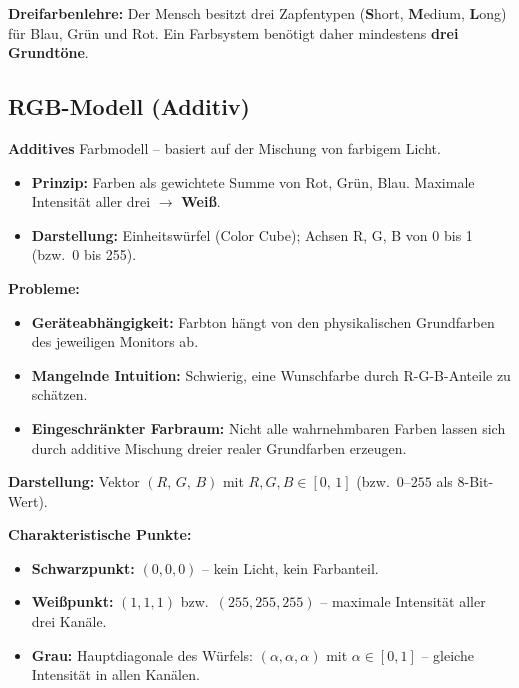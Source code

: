 \documentclass[12pt, a4paper]{article}
\begin{document}
\begin{notebox}
  \textbf{Dreifarbenlehre:} Der Mensch besitzt drei Zapfentypen
  (\textbf{S}hort, \textbf{M}edium, \textbf{L}ong) für Blau, Grün und Rot.
  Ein Farbsystem benötigt daher mindestens \textbf{drei Grundtöne}.
\end{notebox}

\subsection{RGB-Modell (Additiv)}

\textbf{Additives} Farbmodell -- basiert auf der Mischung von farbigem Licht.

\begin{itemize}
  \item \textbf{Prinzip:} Farben als gewichtete Summe von Rot, Grün, Blau.
        Maximale Intensität aller drei $\rightarrow$ \textbf{Weiß}.
  \item \textbf{Darstellung:} Einheitswürfel (Color Cube); Achsen R, G, B von
        0 bis 1 (bzw.\ 0 bis 255).
\end{itemize}

\textbf{Probleme:}
\begin{itemize}
  \item \textbf{Geräteabhängigkeit:} Farbton hängt von den physikalischen
        Grundfarben des jeweiligen Monitors ab.
  \item \textbf{Mangelnde Intuition:} Schwierig, eine Wunschfarbe durch
        R-G-B-Anteile zu schätzen.
  \item \textbf{Eingeschränkter Farbraum:} Nicht alle wahrnehmbaren Farben
        lassen sich durch additive Mischung dreier realer Grundfarben erzeugen.
\end{itemize}

\textbf{Darstellung:} Vektor $(R,\,G,\,B)$ mit $R,G,B \in [0,\,1]$
(bzw.\ $0$--$255$ als 8-Bit-Wert).

\textbf{Charakteristische Punkte:}
\begin{itemize}
  \item \textbf{Schwarzpunkt:} $(0,0,0)$ -- kein Licht, kein Farbanteil.
  \item \textbf{Weißpunkt:} $(1,1,1)$ bzw.\ $(255,255,255)$ -- maximale
        Intensität aller drei Kanäle.
  \item \textbf{Grau:} Hauptdiagonale des Würfels:
        $(\alpha,\alpha,\alpha)$ mit $\alpha \in [0,1]$ --
        gleiche Intensität in allen Kanälen.
\end{itemize}
\end{document}
